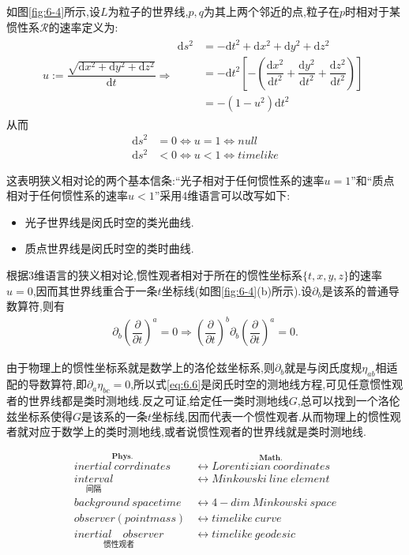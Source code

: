 如图\ref{fig:6-4}所示,设$L$为粒子的世界线,$p,q$为其上两个邻近的点,粒子在$p$时相对于某惯性系$\mathscr{R}$的速率定义为:
\begin{align}
    u:=\dfrac{\sqrt{\text{d}x^2+\text{d}y^2+\text{d}z^2}}{\text{d}t}
\Longrightarrow
\begin{aligned}
    \text{d}s^2&=-\text{d}t^2+\text{d}x^2+\text{d}y^2+\text{d}z^2\\
    &=-\text{d}t^2\left[-\left(\dfrac{\text{d}x^2}{\text{d}t^2}+\dfrac{\text{d}y^2}{\text{d}t^2}+\dfrac{\text{d}z^2}{\text{d}t^2}\right)\right]\\
    &=-(1-u^2)\text{d}t^2
\end{aligned}
\end{align}
从而
$$
\begin{aligned}
\text{d}s^2&=0\Longleftrightarrow u=1 \Longleftrightarrow null\\
\text{d}s^2&<0\Longleftrightarrow u<1 \Longleftrightarrow timelike  
\end{aligned}
$$

这表明狭义相对论的两个基本信条:“光子相对于任何惯性系的速率$u=1$”和“质点相对于任何惯性系的速率$u<1$”采用4维语言可以改写如下:
\begin{itemize}
    \item 光子世界线是闵氏时空的类光曲线.
    \item 质点世界线是闵氏时空的类时曲线.
\end{itemize}

根据3维语言的狭义相对论,惯性观者相对于所在的惯性坐标系$\{t,x,y,z\}$的速率$u=0$,因而其世界线重合于一条$t$坐标线(如图\ref{fig:6-4}(b)所示).设$\partial_b$是该系的普通导数算符,则有
\begin{align}\label{eq:6.6}
    \partial_b\left(\dfrac{\partial}{\partial t}\right)^a=0\Rightarrow \left(\dfrac{\partial}{\partial t}\right)^b\partial_b\left(\dfrac{\partial}{\partial t}\right)^a=0.
\end{align}

由于物理上的惯性坐标系就是数学上的洛伦兹坐标系,则$\partial_b$就是与闵氏度规$\eta_{ab}$相适配的导数算符,即$\partial_a\eta_{bc}=0$,所以式\ref{eq:6.6}是闵氏时空的测地线方程,可见任意惯性观者的世界线都是类时测地线.反之可证,给定任一类时测地线$G$,总可以找到一个洛伦兹坐标系使得$G$是该系的一条$t$坐标线,因而代表一个惯性观者.从而物理上的惯性观者就对应于数学上的类时测地线,或者说惯性观者的世界线就是类时测地线.

$$
\begin{aligned}
\overset{\boldsymbol{Phys.}}{inertial \ corrdinates} &\longleftrightarrow \overset{\boldsymbol{Math.}}{Lorentizian \ coordinates}\\
\underset{\text{间隔}}{interval}&\longleftrightarrow Minkowski\ line\ element\\
background\ spacetime &\longleftrightarrow 4-dim\ Minkowski \ space\\
observer(point mass) &\longleftrightarrow timelike\ curve\\
\underset{\text{惯性观者}}{inertial\quad observer}&\longleftrightarrow timelike\ geodesic
\end{aligned}
$$

